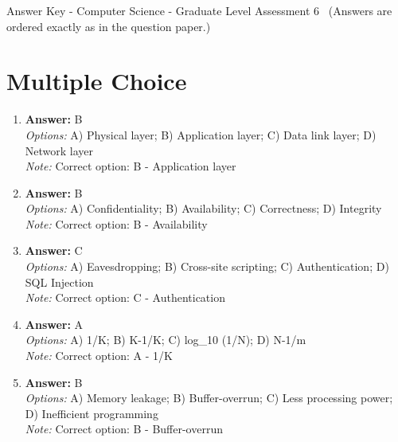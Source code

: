 \documentclass[12pt]{article}
\begin{document}
\begin{center}
Answer Key - Computer Science - Graduate Level Assessment 6 \
\small (Answers are ordered exactly as in the question paper.)
\end{center}

\section*{Multiple Choice}
\begin{enumerate}[label=\arabic*.]
\item \textbf{Answer:} B
\\ \textit{Options:} A) Physical layer; B) Application layer; C) Data link layer; D) Network layer
\\ \textit{Note:} Correct option: B - Application layer
\item \textbf{Answer:} B
\\ \textit{Options:} A) Confidentiality; B) Availability; C) Correctness; D) Integrity
\\ \textit{Note:} Correct option: B - Availability
\item \textbf{Answer:} C
\\ \textit{Options:} A) Eavesdropping; B) Cross-site scripting; C) Authentication; D) SQL Injection
\\ \textit{Note:} Correct option: C - Authentication
\item \textbf{Answer:} A
\\ \textit{Options:} A) 1/K; B) K-1/K; C) log\_10 (1/N); D) N-1/m
\\ \textit{Note:} Correct option: A - 1/K
\item \textbf{Answer:} B
\\ \textit{Options:} A) Memory leakage; B) Buffer-overrun; C) Less processing power; D) Inefficient programming
\\ \textit{Note:} Correct option: B - Buffer-overrun
\end{enumerate}
\end{document}
